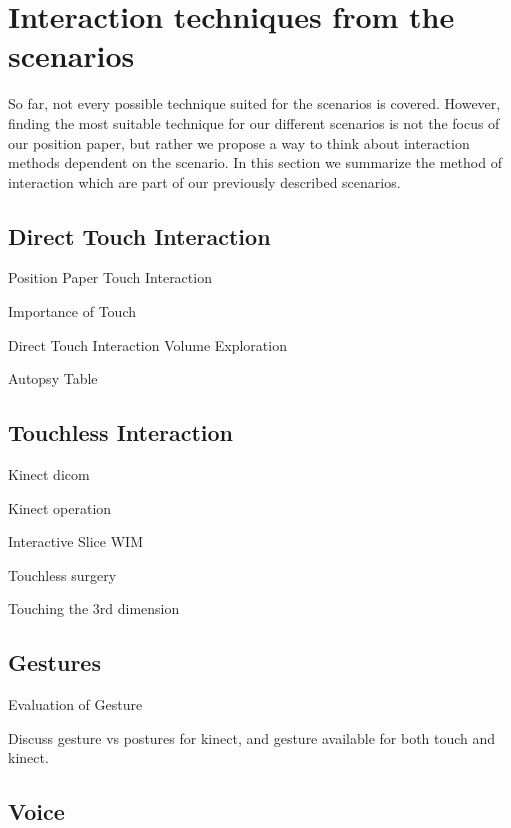 \documentclass[review,journal]{vgtc}         %
\begin{document}
\section{Interaction techniques from the scenarios}

So far, not every possible technique suited for the scenarios is covered. However, finding the most suitable technique for our different scenarios is not the focus of our position paper, but rather we propose a way to think about interaction methods dependent on the scenario. In this section we summarize the method of interaction which are part of our previously described scenarios.

\subsection{Direct Touch Interaction}

Position Paper Touch Interaction \cite{isenberg:hal-00781512}

Importance of Touch \cite{Robles-De-La-Torre:2006:IST:1158827.1159097}

Direct Touch Interaction Volume Exploration \cite{Klein:2012:DSD:2322389.2322403}

Autopsy Table \cite{LRFPY11}

\subsection{Touchless Interaction}

Kinect dicom \cite{zora82163}

Kinect operation \cite{OHaraGSPVMCCRDC14}

Interactive Slice WIM \cite{Coffey:2012:ISW:2360744.2360843}

Touchless surgery \cite{Mentis:2012:IPI:2207676.2208536}

Touching the 3rd dimension \cite{DBLP:journals/dagstuhl-reports/KeefeKSR12}

\subsection{Gestures}

Evaluation of Gesture \cite{Kirmizibayrak:2011:EGB:2087756.2087764}

Discuss gesture vs postures \cite{isenberg:hal-00781237} for kinect, and gesture available for both touch and kinect.

\subsection{Voice}
\end{document}

